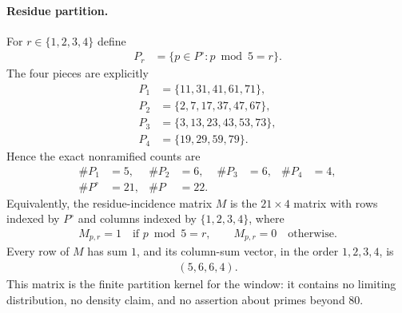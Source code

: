 \paragraph{Residue partition.}
For $r\in\{1,2,3,4\}$ define
$$
\begin{aligned}
P_r &= \{p\in P^{\circ}: p\bmod 5=r\}.
\end{aligned}
$$
The four pieces are explicitly
$$
\begin{aligned}
P_1 &= \{11,31,41,61,71\},\\
P_2 &= \{2,7,17,37,47,67\},\\
P_3 &= \{3,13,23,43,53,73\},\\
P_4 &= \{19,29,59,79\}.
\end{aligned}
$$
Hence the exact nonramified counts are
$$
\begin{aligned}
\#P_1&=5, & \#P_2&=6, & \#P_3&=6, & \#P_4&=4,\\
\#P^{\circ}&=21, & \#P&=22.
\end{aligned}
$$
Equivalently, the residue-incidence matrix $M$ is the $21\times 4$ matrix with rows indexed by $P^{\circ}$ and columns indexed by $\{1,2,3,4\}$, where
$$
\begin{aligned}
M_{p,r}=1 \quad\text{if } p\bmod 5=r,\qquad M_{p,r}=0 \quad\text{otherwise}.
\end{aligned}
$$
Every row of $M$ has sum $1$, and its column-sum vector, in the order $1,2,3,4$, is
$$
\begin{aligned}
(5,6,6,4).
\end{aligned}
$$
This matrix is the finite partition kernel for the window: it contains no limiting distribution, no density claim, and no assertion about primes beyond $80$.

